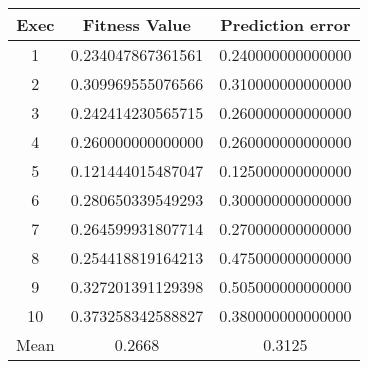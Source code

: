 \begin{table}[H]

\begin{tabular}{ccc}
\hline
Exec                     & Fitness Value                          & Prediction error                       \\ \hline
\multicolumn{1}{|c|}{1}  & \multicolumn{1}{c|}{0.234047867361561} & \multicolumn{1}{c|}{0.240000000000000} \\ \hline
\multicolumn{1}{|c|}{2}  & \multicolumn{1}{c|}{0.309969555076566} & \multicolumn{1}{c|}{0.310000000000000} \\ \hline
\multicolumn{1}{|c|}{3}  & \multicolumn{1}{c|}{0.242414230565715} & \multicolumn{1}{c|}{0.260000000000000} \\ \hline
\multicolumn{1}{|c|}{4}  & \multicolumn{1}{c|}{0.260000000000000} & \multicolumn{1}{c|}{0.260000000000000} \\ \hline
\multicolumn{1}{|c|}{5}  & \multicolumn{1}{c|}{0.121444015487047} & \multicolumn{1}{c|}{0.125000000000000} \\ \hline
\multicolumn{1}{|c|}{6}  & \multicolumn{1}{c|}{0.280650339549293} & \multicolumn{1}{c|}{0.300000000000000} \\ \hline
\multicolumn{1}{|c|}{7}  & \multicolumn{1}{c|}{0.264599931807714} & \multicolumn{1}{c|}{0.270000000000000} \\ \hline
\multicolumn{1}{|c|}{8}  & \multicolumn{1}{c|}{0.254418819164213} & \multicolumn{1}{c|}{0.475000000000000} \\ \hline
\multicolumn{1}{|c|}{9}  & \multicolumn{1}{c|}{0.327201391129398} & \multicolumn{1}{c|}{0.505000000000000} \\ \hline
\multicolumn{1}{|c|}{10} & \multicolumn{1}{c|}{0.373258342588827} & \multicolumn{1}{c|}{0.380000000000000} \\ \hline
Mean                     & 0.2668                                 & 0.3125                                 \\ \hline
\end{tabular}
\end{table}